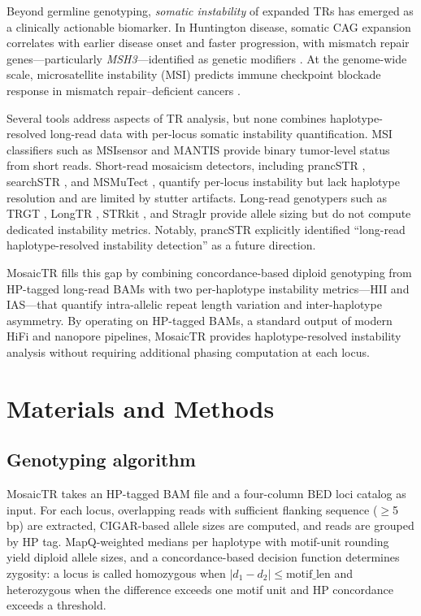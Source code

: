 \documentclass[12pt]{article}
\begin{document}
Beyond germline genotyping, \textit{somatic instability} of expanded TRs has emerged as a clinically actionable biomarker.
In Huntington disease, somatic CAG expansion correlates with earlier disease onset and faster progression, with mismatch repair genes---particularly \textit{MSH3}---identified as genetic modifiers \citep{swami2009, ciosi2019, genetic-modifiers-hd2019}.
At the genome-wide scale, microsatellite instability (MSI) predicts immune checkpoint blockade response in mismatch repair--deficient cancers \citep{le2015}.

Several tools address aspects of TR analysis, but none combines haplotype-resolved long-read data with per-locus somatic instability quantification.
MSI classifiers such as MSIsensor \citep{niu2014} and MANTIS \citep{kautto2017} provide binary tumor-level status from short reads.
Short-read mosaicism detectors, including prancSTR \citep{sehgal2024}, searchSTR \citep{aziz2025}, and MSMuTect \citep{maruvka2017}, quantify per-locus instability but lack haplotype resolution and are limited by stutter artifacts.
Long-read genotypers such as TRGT \citep{dolzhenko2024}, LongTR \citep{ziaei-jam2024}, STRkit \citep{liu2024strkit}, and Straglr \citep{chiu2021} provide allele sizing but do not compute dedicated instability metrics.
Notably, prancSTR explicitly identified ``long-read haplotype-resolved instability detection'' as a future direction.

MosaicTR fills this gap by combining concordance-based diploid genotyping from HP-tagged long-read BAMs with two per-haplotype instability metrics---HII and IAS---that quantify intra-allelic repeat length variation and inter-haplotype asymmetry.
By operating on HP-tagged BAMs, a standard output of modern HiFi and nanopore pipelines, MosaicTR provides haplotype-resolved instability analysis without requiring additional phasing computation at each locus.

\section{Materials and Methods}

\subsection{Genotyping algorithm}

MosaicTR takes an HP-tagged BAM file and a four-column BED loci catalog as input.
For each locus, overlapping reads with sufficient flanking sequence ($\geq$5\,bp) are extracted, CIGAR-based allele sizes are computed, and reads are grouped by HP tag.
MapQ-weighted medians per haplotype with motif-unit rounding yield diploid allele sizes, and a concordance-based decision function determines zygosity: a locus is called homozygous when $|d_1 - d_2| \leq \text{motif\_len}$ and heterozygous when the difference exceeds one motif unit and HP concordance exceeds a threshold.
\end{document}
